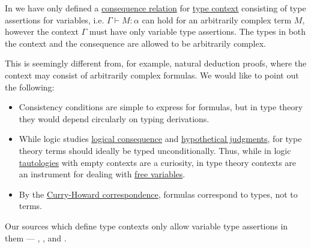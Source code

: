 \begin{remark}\label{rem:type_context_only_variables}
  In  we have only defined a \hyperref[def:consequence_relation]{consequence relation} for \hyperref[def:type_context]{type context} consisting of type assertions for variables, i.e. \( \Gamma \vdash M: \alpha \) can hold for an arbitrarily complex term \( M \), however the context \( \Gamma \) must have only variable type assertions. The types in both the context and the consequence are allowed to be arbitrarily complex.

  This is seemingly different from, for example, natural deduction proofs, where the context may consist of arbitrarily complex formulas. We would like to point out the following:
  \begin{itemize}
    \item Consistency conditions are simple to express for formulas, but in type theory they would depend circularly on typing derivations.

    \item While logic studies \hyperref[def:consequence_relation]{logical consequence} and \hyperref[con:hypothetical_judgment]{hypothetical judgments}, for type theory terms should ideally be typed unconditionally. Thus, while in logic \hyperref[def:propositional_tautology]{tautologies} with empty contexts are a curiosity, in type theory contexts are an instrument for dealing with \hyperref[def:lambda_variable_freeness]{free variables}.

    \item By the \hyperref[con:curry_howard_correspondence]{Curry-Howard correspondence}, formulas correspond to types, not to terms.
  \end{itemize}

  Our sources which define type contexts only allow variable type assertions in them ---
  ,
  ,
   and
  .
\end{remark}

